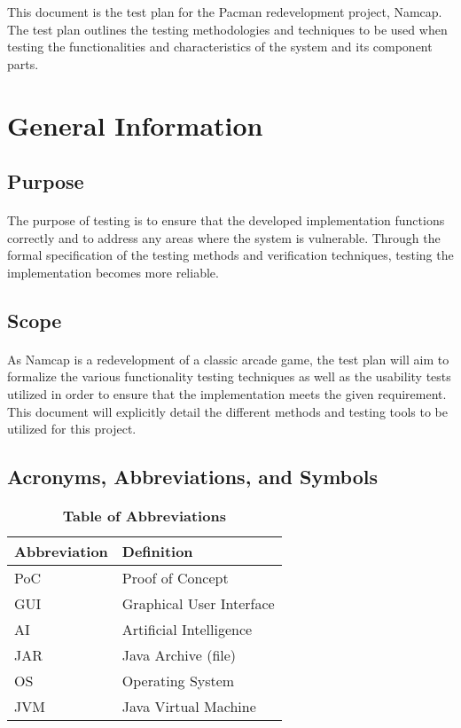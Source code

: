 \documentclass[12pt, titlepage]{article}
\begin{document}
This document is the test plan for the Pacman redevelopment project, Namcap. The test plan outlines the testing methodologies and techniques to be used when testing the functionalities and characteristics of the system and its component parts.

\section{General Information}

\subsection{Purpose}
\paragraph{}
The purpose of testing is to ensure that the developed implementation functions correctly and to address any areas where the system is vulnerable. Through the formal specification of the testing methods and verification techniques, testing the implementation becomes more reliable.

\subsection{Scope}
\paragraph{}
As Namcap is a redevelopment of a classic arcade game, the test plan will aim to formalize the various functionality testing techniques as well as the usability tests utilized in order to ensure that the implementation meets the given requirement. This document will explicitly detail the different methods and testing tools to be utilized for this project.

\subsection{Acronyms, Abbreviations, and Symbols}
	
\begin{table}[hbp]
\caption{\textbf{Table of Abbreviations}} \label{Table}

\begin{tabularx}{\textwidth}{p{3cm}X}
\toprule
\textbf{Abbreviation} & \textbf{Definition} \\
\midrule
PoC & Proof of Concept\\
GUI & Graphical User Interface\\
AI & Artificial Intelligence\\
JAR & Java Archive (file)\\
OS & Operating System\\
JVM & Java Virtual Machine\\
\bottomrule
\end{tabularx}

\end{table}
\end{document}
